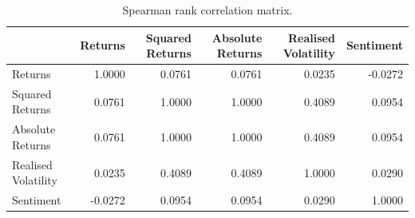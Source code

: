 \begin{table}[htbp]
\centering
\begin{tabular}{lrrrrr}
\toprule
 & Returns & Squared Returns & Absolute Returns & Realised Volatility & Sentiment \\
\midrule
Returns & 1.0000 & 0.0761 & 0.0761 & 0.0235 & -0.0272 \\
Squared Returns & 0.0761 & 1.0000 & 1.0000 & 0.4089 & 0.0954 \\
Absolute Returns & 0.0761 & 1.0000 & 1.0000 & 0.4089 & 0.0954 \\
Realised Volatility & 0.0235 & 0.4089 & 0.4089 & 1.0000 & 0.0290 \\
Sentiment & -0.0272 & 0.0954 & 0.0954 & 0.0290 & 1.0000 \\
\bottomrule
\end{tabular}
\caption{Spearman rank correlation matrix.}
\label{tab:correlation_spearman}
\end{table}
